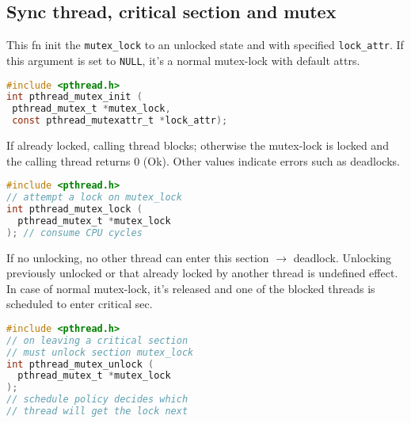 \subsection*{Sync thread, critical section and mutex}
\begin{minipage}{0.5\linewidth}
  \flushleft
  This fn init the \texttt{mutex\_lock} to an unlocked state and with specified \texttt{lock\_attr}. If this argument is set to \texttt{NULL}, it's a normal mutex-lock with default attrs.
\end{minipage}
\begin{minipage}{0.5\linewidth}
\begin{lstlisting}[language=C,xleftmargin=1pt]
#include <pthread.h>
int pthread_mutex_init (
 pthread_mutex_t *mutex_lock,
 const pthread_mutexattr_t *lock_attr);
\end{lstlisting}
\end{minipage}
\begin{minipage}{0.5\linewidth}
  \flushleft
  If already locked, calling thread blocks; otherwise the mutex-lock is locked and the calling thread returns 0 (Ok).   Other values indicate errors such as deadlocks.
\end{minipage}
\begin{minipage}{0.5\linewidth}
\begin{lstlisting}[language=C,xleftmargin=1pt]
#include <pthread.h>
// attempt a lock on mutex_lock
int pthread_mutex_lock (
  pthread_mutex_t *mutex_lock
); // consume CPU cycles
\end{lstlisting}
\end{minipage}
\begin{minipage}{0.5\linewidth}
  \flushleft
  If no unlocking, no other thread can enter this section $\rightarrow$ deadlock.  Unlocking previously unlocked or that already locked by another thread is undefined effect.  In case of normal mutex-lock, it's released and one of the blocked threads is scheduled to enter critical sec.
\end{minipage}
\begin{minipage}{0.5\linewidth}
\begin{lstlisting}[language=C,xleftmargin=1pt]
#include <pthread.h>
// on leaving a critical section
// must unlock section mutex_lock
int pthread_mutex_unlock (
  pthread_mutex_t *mutex_lock
);
// schedule policy decides which
// thread will get the lock next
\end{lstlisting}
\end{minipage}
